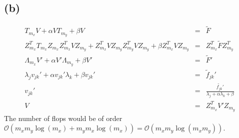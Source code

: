 \documentclass[11pt]{article}
\theoremstyle{definition}
\theoremstyle{remark}
\newcommand{\newquestion}{\hrulefill\vspace{-0.8\baselineskip}\\\null\hrulefill\vspace{-1.0\baselineskip}}
\newcommand{\newpart}{\vspace{-0.5\baselineskip}\hrulefill\vspace{-1.3\baselineskip}}
\theoremstyle{plain}
\begin{document}
\newpart
\subsection*{(b)}
\begin{eqnarray*}
  T_{m_x}V+\alpha VT_{m_y}+\beta V&=&\tilde{F}\\
  Z_{m_x}^TT_{m_x}Z_{m_x}Z_{m_x}^TVZ_{m_y}+Z_{m_x}^TVZ_{m_y}Z_{m_y}^TVZ_{m_y}+\beta Z_{m_x}^TVZ_{m_y}&=&Z_{m_x}^T\tilde{F}Z_{m_y}^T\\
  \Lambda_{m_x} V'+\alpha V'\Lambda_{m_y}+\beta V'&=&\tilde{F}'\\
  \lambda_j v_{jk}'+\alpha v_{jk}'\lambda_k+\beta v_{jk}'&=&\tilde{f}_{jk}'\\
  v_{jk}'&=&\frac{\tilde{f_{jk}}'}{\lambda_{j}+\alpha \lambda_k+\beta}\\
  V&=&Z_{m_x}^TV'Z_{m_y}
\end{eqnarray*}
The number of flops would be of order $\mathcal{O}\left(m_xm_y\log\left(m_x\right)+m_ym_x\log\left(m_x\right)\right)=\mathcal{O}\left(m_xm_y\log\left(m_xm_y\right)\right)$.

\newpage
\newquestion
%
%
\end{document}
